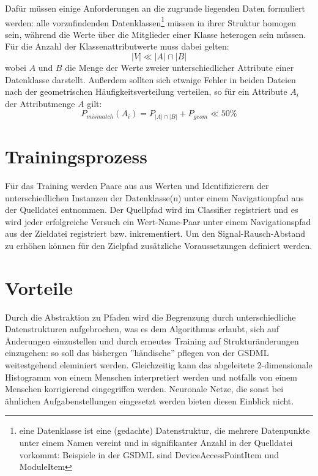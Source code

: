 \documentclass[a4paper,10pt]{article}
\begin{document}
Dafür müssen einige Anforderungen an die zugrunde liegenden Daten formuliert werden: alle vorzufindenden
Datenklassen\footnote{eine Datenklasse ist eine (gedachte) Datenstruktur, die mehrere Datenpunkte unter
einem Namen vereint und in signifikanter Anzahl in der Quelldatei vorkommt: Beispiele in der GSDML sind
DeviceAccessPointItem und ModuleItem} müssen in ihrer Struktur homogen sein, während die Werte über die
Mitglieder einer Klasse heterogen sein müssen. Für die Anzahl der Klassenattributwerte muss dabei gelten:
\begin{displaymath}
 \lvert V \rvert \ll \lvert A \rvert \cap \lvert B \rvert
\end{displaymath}
wobei $A$ und $B$ die Menge der Werte zweier unterschiedlicher Attribute einer Datenklasse darstellt.\newline
Außerdem sollten sich etwaige Fehler in beiden Dateien nach der geometrischen Häufigkeitsverteilung
verteilen, so für ein Attribute $A_i$ der Attributmenge $A$ gilt:
\begin{displaymath}
 P_{mismatch} (A_i) = P_{\lvert A\rvert \cap\lvert B\rvert} + P_{geom} \ll 50\%
\end{displaymath}

\section{Trainingsprozess}
Für das Training werden Paare aus aus Werten und Identifizierern der unterschiedlichen Instanzen der
Datenklasse(n) unter einem Navigationpfad aus der Quelldatei entnommen. Der Quellpfad wird im
Classifier registriert und es wird jeder erfolgreiche Versuch ein Wert-Name-Paar unter einem
Navigationspfad aus der Zieldatei registriert bzw. inkrementiert. Um den Signal-Rausch-Abstand zu
erhöhen können für den Zielpfad zusätzliche Voraussetzungen definiert werden.

\section{Vorteile}
Durch die Abstraktion zu Pfaden wird die Begrenzung durch unterschiedliche Datenstrukturen aufgebrochen,
was es dem Algorithmus erlaubt, sich auf Änderungen einzustellen und durch erneutes Training auf
Strukturänderungen einzugehen: so soll das bishergen ''händische'' pflegen von der GSDML weitestgehend
eleminiert werden. Gleichzeitig kann das abgeleitete 2-dimensionale Histogramm von einem Menschen
interpretiert werden und notfalls von einem Menschen korrigierend eingegriffen werden. Neuronale Netze,
die sonst bei ähnlichen Aufgabenstellungen eingesetzt werden bieten diesen Einblick nicht.
\end{document}
